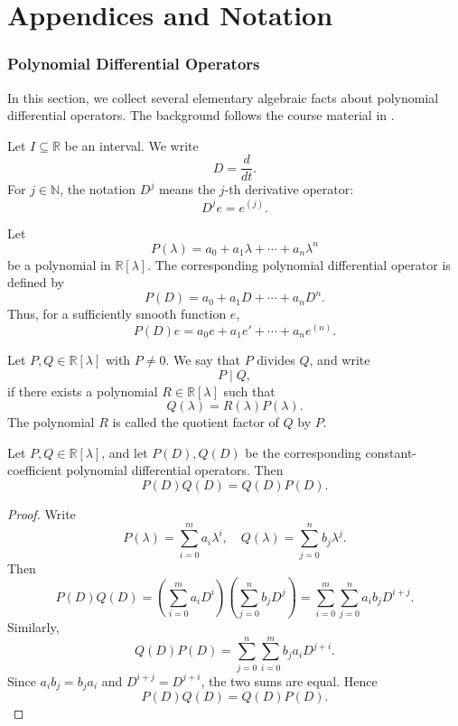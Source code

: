 ﻿\documentclass[12pt]{article}
\begin{document}
\part{Appendices and Notation}

\appendix
\section{Polynomial Differential Operators}\label{appendix:operator-algebra}
In this section, we collect several elementary algebraic facts about polynomial differential
operators. The background follows the course material in
\cite{le_van_luyen_la1a}.

Let $I \subseteq\mathbb R$ be an interval. We write
\[
 D = \frac{d}{dt}.
\]
For $j \in \mathbb N$, the notation $D^j$ means the $j$-th derivative operator:
\[
 D^j e = e^{(j)}.
\]

\begin{definition}
Let
\[
 P(\lambda) = a_0 + a_1\lambda + \cdots + a_n\lambda^n
\]
be a polynomial in $\mathbb R[\lambda]$. The corresponding polynomial differential operator is defined by
\[
 P(D) = a_0 + a_1D + \cdots + a_nD^n.
\]
Thus, for a sufficiently smooth function $e$,
\[
 P(D)e
 =
 a_0e + a_1e' + \cdots + a_ne^{(n)}.
\]
\end{definition}

\begin{definition}
Let $P, Q \in \mathbb R[\lambda]$ with $P \neq 0$. We say that $P$ divides $Q$, and write
\[
 P \mid Q,
\]
if there exists a polynomial $R \in \mathbb R[\lambda]$ such that
\[
 Q(\lambda) = R(\lambda)P(\lambda).
\]
The polynomial $R$ is called the quotient factor of $Q$ by $P$.
\end{definition}
\begin{lemma}\label{lem:operator-commutativity}
Let $P, Q \in \mathbb R[\lambda]$, and let $P(D), Q(D)$ be the corresponding constant-coefficient polynomial differential operators. Then
\[
 P(D)Q(D) = Q(D)P(D).
\]
\end{lemma}

\begin{proof}
Write
\[
 P(\lambda) = \sum_{i = 0}^m a_i\lambda^i,
 \quad
 Q(\lambda) = \sum_{j = 0}^n b_j\lambda^j.
\]
Then
\[
 P(D)Q(D)
 =
 \left(\sum_{i = 0}^m a_iD^i\right)
 \left(\sum_{j = 0}^n b_jD^j\right)
 =
 \sum_{i = 0}^m\sum_{j = 0}^n a_ib_jD^{i + j}.
\]
Similarly,
\[
 Q(D)P(D)
 =
 \sum_{j = 0}^n\sum_{i = 0}^m b_ja_iD^{j + i}.
\]
Since $a_ib_j = b_ja_i$ and $D^{i + j} = D^{j + i}$, the two sums are equal. Hence
\[
 P(D)Q(D) = Q(D)P(D).
\]
\end{proof}
\end{document}
